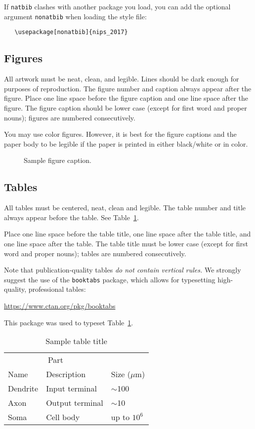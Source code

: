 \documentclass{article}
\begin{document}
If \verb+natbib+ clashes with another package you load, you can add
the optional argument \verb+nonatbib+ when loading the style file:
\begin{verbatim}
   \usepackage[nonatbib]{nips_2017}
\end{verbatim}


\subsection{Figures}

All artwork must be neat, clean, and legible. Lines should be dark
enough for purposes of reproduction. The figure number and caption
always appear after the figure. Place one line space before the figure
caption and one line space after the figure. The figure caption should
be lower case (except for first word and proper nouns); figures are
numbered consecutively.

You may use color figures.  However, it is best for the figure
captions and the paper body to be legible if the paper is printed in
either black/white or in color.
\begin{figure}[h]
  \centering
  \fbox{\rule[-.5cm]{0cm}{4cm} \rule[-.5cm]{4cm}{0cm}}
  \caption{Sample figure caption.}
\end{figure}

\subsection{Tables}

All tables must be centered, neat, clean and legible.  The table
number and title always appear before the table.  See
Table~\ref{sample-table}.

Place one line space before the table title, one line space after the
table title, and one line space after the table. The table title must
be lower case (except for first word and proper nouns); tables are
numbered consecutively.

Note that publication-quality tables \emph{do not contain vertical
  rules.} We strongly suggest the use of the \verb+booktabs+ package,
which allows for typesetting high-quality, professional tables:
\begin{center}
  \url{https://www.ctan.org/pkg/booktabs}
\end{center}
This package was used to typeset Table~\ref{sample-table}.

\begin{table}[t]
  \caption{Sample table title}
  \label{sample-table}
  \centering
  \begin{tabular}{lll}
    \toprule
    \multicolumn{2}{c}{Part}                   \\
    \cmidrule{1-2}
    Name     & Description     & Size ($\mu$m) \\
    \midrule
    Dendrite & Input terminal  & $\sim$100     \\
    Axon     & Output terminal & $\sim$10      \\
    Soma     & Cell body       & up to $10^6$  \\
    \bottomrule
  \end{tabular}
\end{table}
\end{document}
